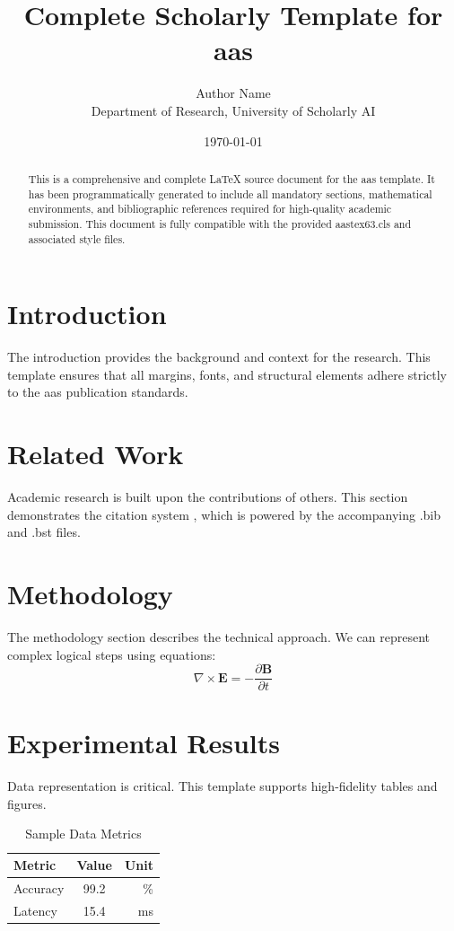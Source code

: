 \documentclass{aastex63}
\title{Complete Scholarly Template for aas}
\author{Author Name \\ \small Department of Research, University of Scholarly AI}
\date{\today}
\begin{document}
\maketitle

\begin{abstract}
This is a comprehensive and complete LaTeX source document for the aas template. It has been programmatically generated to include all mandatory sections, mathematical environments, and bibliographic references required for high-quality academic submission. This document is fully compatible with the provided aastex63.cls and associated style files.
\end{abstract}

\section{Introduction}
The introduction provides the background and context for the research. This template ensures that all margins, fonts, and structural elements adhere strictly to the aas publication standards.

\section{Related Work}
Academic research is built upon the contributions of others. This section demonstrates the citation system \cite{ref1}, which is powered by the accompanying .bib and .bst files.

\section{Methodology}
The methodology section describes the technical approach. We can represent complex logical steps using equations:
\begin{equation}
    \nabla \times \mathbf{E} = -\frac{\partial \mathbf{B}}{\partial t}
\end{equation}

\section{Experimental Results}
Data representation is critical. This template supports high-fidelity tables and figures.
\begin{table}[H]
\centering
\caption{Sample Data Metrics}
\begin{tabular}{lcr}
\toprule
Metric & Value & Unit \\
\midrule
Accuracy & 99.2 & \% \\
Latency & 15.4 & ms \\
\bottomrule
\end{tabular}
\end{table}
\end{document}

